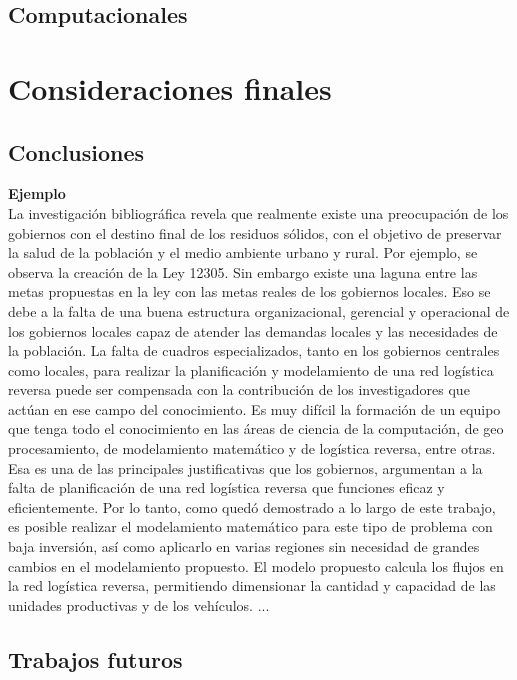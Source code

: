 \section{Computacionales}




\chapter{Consideraciones finales}


\section{Conclusiones}

{\bf Ejemplo}\\
La investigación bibliográfica revela que realmente existe una preocupación de los gobiernos con el destino final de los residuos sólidos, con el objetivo de preservar la salud de la población y el medio ambiente urbano y rural. Por ejemplo, se observa la creación de la Ley 12305. Sin embargo existe una laguna entre las metas propuestas en la ley con las metas reales de los gobiernos locales. Eso se debe a la falta de una buena estructura organizacional, gerencial y operacional de los gobiernos locales capaz de atender las demandas locales y las necesidades de la población.
\vskip 0.3cm
La falta de cuadros especializados, tanto en los gobiernos centrales como locales, para realizar la planificación y modelamiento de una red logística reversa puede ser compensada con la contribución de los investigadores que actúan en ese campo del conocimiento. Es muy difícil la formación de un equipo que tenga todo el conocimiento en las áreas de ciencia de la computación, de geo procesamiento, de modelamiento matemático y de logística reversa, entre otras. Esa es una de las principales justificativas que los gobiernos, argumentan a la falta de planificación de una red logística reversa que funciones eficaz y eficientemente. 
\vskip 0.3cm
Por lo tanto, como quedó demostrado a lo largo de este trabajo, es posible realizar el modelamiento matemático para este tipo de problema con baja inversión, así como aplicarlo en varias regiones sin necesidad de grandes cambios en el modelamiento propuesto. El modelo propuesto calcula los flujos en la red logística reversa, permitiendo dimensionar la cantidad y capacidad de las unidades productivas y de los vehículos. 
\vskip 0.3cm
...


\section{Trabajos futuros}




\cleardoublepage
\renewcommand\bibname{Referencias bibliográficas}


